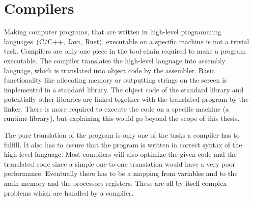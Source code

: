 \section{Compilers}
\label{sec:bg:compilers}
%
Making computer programs, that are written in high-level programming languages~(\eg C/C++, Java, Rust), executable on a specific machine is not a trivial task.
Compilers are only one piece in the tool-chain required to make a program executable.
The compiler translates the high-level language into assembly language, which is translated into object code by the assembler.
Basic functionality like allocating memory or outputting strings on the screen is implemented in a standard library.
The object code of the standard library and potentially other libraries are linked together with the translated program by the linker.
There is more required to execute the code on a specific machine (\eg a runtime library), but explaining this would go beyond the scope of this thesis.

The pure translation of the program is only one of the tasks a compiler has to fulfill.
It also has to assure that the program is written in correct syntax of the high-level language.
Most compilers will also optimize the given code and the translated code since a simple one-to-one translation would have a very poor performance.
Eventually there has to be a mapping from variables and to the main memory and the processors registers.
These are all by itself complex problems which are handled by a compiler.

